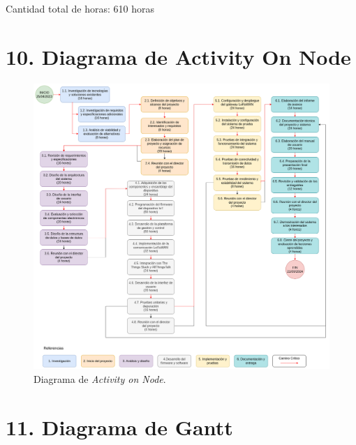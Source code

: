 \documentclass[
11pt, %
]{charter}
\begin{document}
Cantidad total de horas: 610 horas


\vspace*{\fill}
\pagebreak
\section{10. Diagrama de Activity On Node}
\label{sec:AoN}

\begin{figure}[htpb]
\centering 
\includegraphics[width=1.1\textwidth]{./Figuras/AoN.png}
\caption{Diagrama de \textit{Activity on Node}.}
\label{fig:AoN}
\end{figure}



\section{11. Diagrama de Gantt}
\label{sec:gantt}
\end{document}
